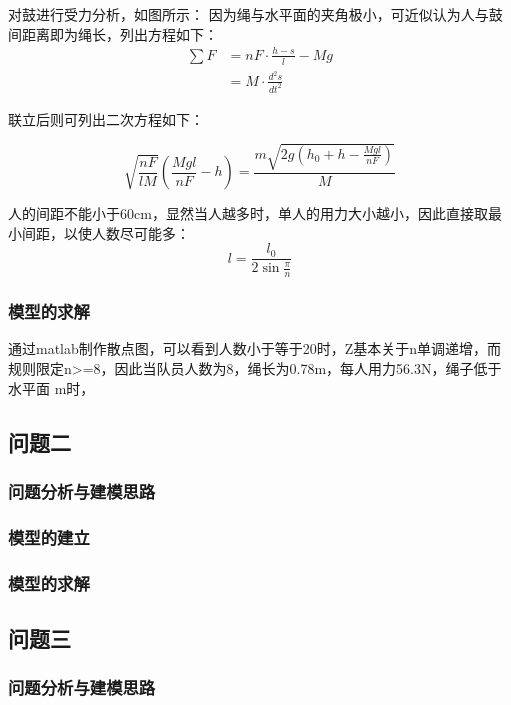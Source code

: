 \documentclass[withoutpreface,bwprint]{cumcmthesis} %
\begin{document}
\par
对鼓进行受力分析，如图所示：
因为绳与水平面的夹角极小，可近似认为人与鼓间距离即为绳长，列出方程如下：
\begin{align}
\sum F  &= n F\cdot \frac{h-s}{l}-M g \\
 &=M\cdot \frac{d^{2}s}{dt^{2}}
\label{1}
\end{align}


联立后则可列出二次方程如下：

\begin{equation}
\sqrt{\frac{nF}{lM}}\left ( \frac{Mgl}{nF}-h \right )=\frac{m\sqrt{2g\left ( h_0+h-\frac{Mgl}{nF} \right )}}{M}
\end{equation}

人的间距不能小于60cm，显然当人越多时，单人的用力大小越小，因此直接取最小间距，以使人数尽可能多：
\begin{equation}
l=\frac{l_0}{2\sin\frac{\pi}{n}}
\end{equation}
	\subsubsection{模型的求解}
通过matlab制作散点图，可以看到人数小于等于20时，Z基本关于n单调递增，而规则限定n>=8，因此当队员人数为8，绳长为0.78m，每人用力56.3N，绳子低于水平面 m时，

\subsection{问题二}
	\subsubsection{问题分析与建模思路}


	\subsubsection{模型的建立}


	\subsubsection{模型的求解}

\subsection{问题三}
	\subsubsection{问题分析与建模思路}
\end{document}
